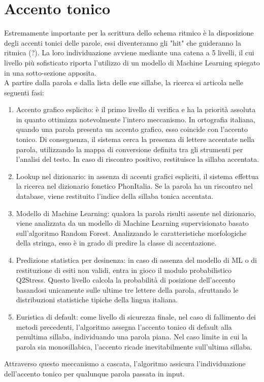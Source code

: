 \section{Accento tonico}
Estremamente importante per la scrittura dello schema ritmico è la disposizione degli accenti tonici delle parole, essi  diventeranno gli "hit" che 
guideranno la ritmica (?). La loro individuazione avviene mediante una catena a 5 livelli, il cui livello più sofisticato riporta l'utilizzo di un 
modello di Machine Learning spiegato in una sotto-sezione apposita.\\
A partire dalla parola e dalla lista delle sue sillabe, la ricerca si articola nelle seguenti fasi:
\begin{enumerate}
      \item Accento grafico esplicito: è il primo livello di verifica e ha la priorità assoluta in quanto ottimizza notevolmente l'intero meccanismo. 
      In ortografia italiana, quando una parola presenta un accento grafico, esso coincide con l'accento tonico. Di conseguenza, il sistema cerca 
      la presenza di lettere accentate nella parola, utilizzando la mappa di conversione definita tra gli strumenti per l'analisi del testo. 
      In caso di riscontro positivo, restituisce la sillaba accentata.
      \item Lookup nel dizionario: in assenza di accenti grafici espliciti, il sistema effettua la ricerca nel dizionario fonetico PhonItalia. 
      Se la parola ha un riscontro nel database, viene restituito l'indice della sillaba tonica accentata.
      \item Modello di Machine Learning: qualora la parola risulti assente nel dizionario, viene analizzata da un modello di Machine Learning supervisionato 
      basato sull'algoritmo Random Forest. Analizzando le caratteristiche morfologiche della stringa, esso è in grado di predire la classe di accentazione.
      \item Predizione statistica per desinenza: in caso di assenza del modello di ML o di restituzione di esiti non validi, entra in gioco il modulo 
      probabilistico Q2Stress. Questo livello calcola la probabilità di posizione dell'accento basandosi unicamente sulle ultime tre lettere della parola, 
      sfruttando le distribuzioni statistiche tipiche della lingua italiana. 
      \item Euristica di default: come livello di sicurezza finale, nel caso di fallimento dei metodi precedenti, l'algoritmo assegna l'accento tonico di 
      default alla penultima sillaba, individuando una parola piana. Nel caso limite in cui la parola sia monosillabica, l'accento ricade inevitabilmente 
      sull'ultima sillaba.
\end{enumerate} 
Attraverso questo meccanismo a cascata, l'algoritmo assicura l'individuazione dell'accento tonico per qualunque parola passata in input.



